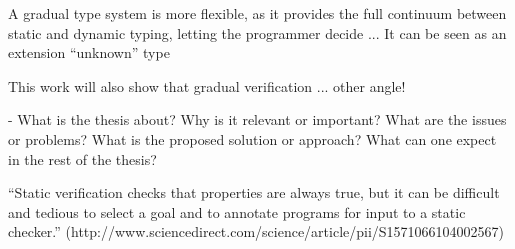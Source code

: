 A gradual type system is more flexible, as it provides the full continuum between static and dynamic typing, letting the programmer decide ... %
It can be seen as an extension  “unknown” type 


This work will also show that gradual verification ... other angle!

- 
What is the thesis about?
Why is it relevant or important?
What are the issues or problems?
What is the proposed solution or approach?
What can one expect in the rest of the thesis?

“Static verification checks that properties are always true, but it can be difficult and tedious to select a goal and to annotate programs for input to a static checker.” (http://www.sciencedirect.com/science/article/pii/S1571066104002567)
